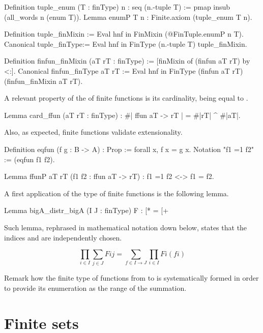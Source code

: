 \begin{coq}{}{}
Definition tuple_enum (T : finType) n : seq (n.-tuple T) :=
  pmap insub (all_words n (enum T)).
Lemma enumP T n : Finite.axiom (tuple_enum T n).

Definition tuple_finMixin := Eval hnf in FinMixin (@FinTuple.enumP n T).
Canonical tuple_finType:= Eval hnf in FinType (n.-tuple T) tuple_finMixin.

Definition finfun_finMixin (aT rT : finType) :=
  [finMixin of (finfun aT rT) by <:].
Canonical finfun_finType  aT rT :=
  Eval hnf in FinType (finfun aT rT) (finfun_finMixin aT rT).
\end{coq}

A relevant property of the  of finite functions is its
cardinality, being equal to .

\begin{coq}{}{}
Lemma card_ffun (aT rT : finType) : #| {ffun aT -> rT} | = #|rT| ^ #|aT|.
\end{coq}

Also, as expected, finite functions validate extensionality.

\begin{coq}{}{}
Definition eqfun (f g : B -> A) : Prop := forall x, f x = g x.
Notation "f1 =1 f2" := (eqfun f1 f2).

Lemma ffunP aT rT (f1 f2 : {ffun aT -> rT}) : f1 =1 f2 <-> f1 = f2.
\end{coq}

A first application of the type of finite functions is the following
lemma.

\begin{coq}{}{}
Lemma bigA_distr_bigA (I J : finType) F :
  \big[*%
    = \big[+%
\end{coq}

Such lemma, rephrased in mathematical notation down below,
states that the indices  and  are independently chosen.

$$
\prod_{i \in I} \sum_{j \in J} F i j = \sum_{f \in I \to J} \prod_{i \in I} F i (f i)
$$

Remark how the finite type of
functions from  to  is systematically formed in order to
provide its enumeration as the range of the summation.

\section{Finite sets}


